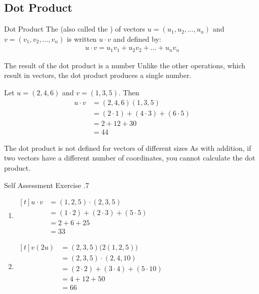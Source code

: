 \documentclass[../notes.tex]{subfiles}
\begin{document}
			\subsection{Dot Product}
				\begin{definition}[width=0.87\textwidth]{Dot Product}
					The  (also called the ) of vectors $u = (u_{1}, u_{2}, \ldots, u_{n})$ and \\$v = (v_{1}, v_{2}, \ldots, v_{n})$ is written $u \cdot v$ and defined by:
					\begin{align*}
						u \cdot v = u_{1}v_{1} + u_{2}v_{2} + \ldots + u_{n}v_{n}
					\end{align*}
				\end{definition}
				\begin{sidenote}{The result of the dot product is a number}
					Unlike the other operations, which result in vectors, the dot product produces a single number.
				\end{sidenote}
				\begin{example}[width=0.6\textwidth]
					Let $u = (2, 4, 6)$ and $v = (1, 3, 5)$. Then
					\begin{align*}
						u \cdot v &= (2, 4, 6)(1, 3, 5)\\
						&= (2 \cdot 1) + (4 \cdot 3) + (6 \cdot 5)\\
						&= 2 + 12 + 30\\
						&= 44
					\end{align*}
				\end{example}
				\begin{sidenote}{The dot product is not defined for vectors of different sizes}
					As with addition, if two vectors have a different number of coordinates, you cannot calculate the dot product.
				\end{sidenote}
			\begin{exercise}{Self Assessment Exercise \thechapter.7}
				\begin{enumerate}[label=(\alph*)]
					\item {} \hfill
						$ \begin{aligned}[t]
							u \cdot v &= (1, 2, 5) \cdot (2, 3, 5)\\
							&= (1 \cdot 2) + (2 \cdot 3) + (5 \cdot 5)\\
							&= 2 + 6 + 25\\
							&= 33
						\end{aligned} $\hfill \phantom{}
					\item {} \hfill $
						\begin{aligned}[t]
							v(2u) &= (2, 3, 5)\bigl(2(1, 2, 5)\bigr)\\
							&= (2, 3, 5) \cdot (2, 4, 10)\\
							&= (2 \cdot 2) + (3 \cdot 4) + (5 \cdot 10)\\
							&= 4 + 12 + 50\\
							&= 66
						\end{aligned} $ \hfill \phantom{}
				\end{enumerate}
			\end{exercise}
		\pagebreak
\end{document}
